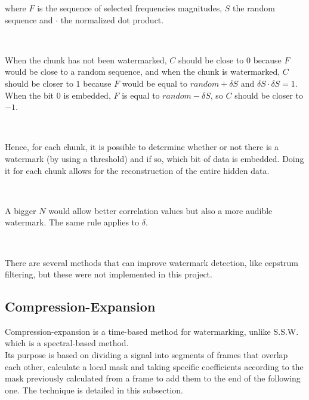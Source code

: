 \noindent where $F$ is the sequence of selected frequencies magnitudes, $S$ the random sequence and $\cdot$ the normalized dot product.

~

When the chunk has not been watermarked, $C$ should be close to $0$ because $F$ would be close to a random sequence, and when the chunk is watermarked, $C$ should be closer to $1$ because $F$ would be equal to $random + \delta S$ and $\delta S \cdot \delta S = 1$. When the bit 0 is embedded, $F$ is equal to $random - \delta S$, so $C$ should be closer to $-1$.

~

Hence, for each chunk, it is possible to determine whether or not there is a watermark (by using a threshold) and if so, which bit of data is embedded. Doing it for each chunk allows for the reconstruction of the entire hidden data.

~

A bigger $N$ would allow better correlation values but also a more audible watermark. The same rule applies to $\delta$.

~

There are several methods that can improve watermark detection, like cepstrum filtering, but these were not implemented in this project.

\subsection{Compression-Expansion}\cite{foo2010}

Compression-expansion is a time-based method for watermarking, unlike S.S.W. which is a spectral-based method.\\
Its purpose is based on dividing a signal into segments of frames that overlap each other, calculate a local mask and taking specific coefficients according to the mask previously calculated from a frame to add them to the end of the following one. The technique is detailed in this subsection.

